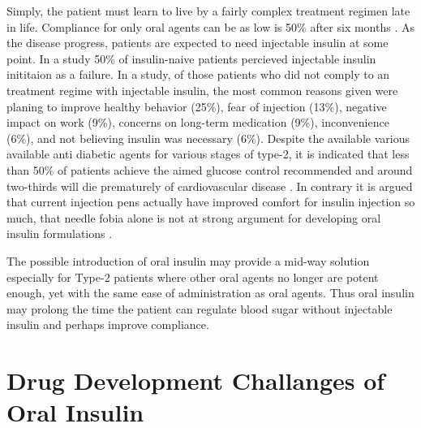 Simply, the patient must learn to live by a fairly complex treatment regimen late in life. Compliance for only oral agents can be as low is 50\% after six months \cite{garcia2013adherence}. As the disease progress, patients are expected to need injectable insulin at some point. In a study 50\% of insulin-naive patients percieved injectable insulin inititaion as a failure. In a study, of those patients who did not comply to an treatment regime with injectable insulin, the most common reasons given were planing to improve healthy behavior (25\%), fear of injection (13\%), negative impact on work (9\%), concerns on long-term medication (9\%), inconvenience (6\%), and not believing insulin was necessary (6\%). Despite the available various available anti diabetic agents for various stages of type-2, it is indicated that less than 50\% of patients achieve the aimed glucose control recommended and around two-thirds will die prematurely of cardiovascular disease \cite{garcia2013adherence}. In contrary it is argued that current injection pens actually have improved comfort for insulin injection so much, that needle fobia alone is not at strong argument for developing oral insulin formulations \cite{maher2014formulation}.

The possible introduction of oral insulin may provide a mid-way solution especially for Type-2 patients where other oral agents no longer are potent enough, yet with the same ease of administration as oral agents. Thus oral insulin may prolong the time the patient can regulate blood sugar without injectable insulin and perhaps improve compliance.

\section{Drug Development Challanges of Oral Insulin}

